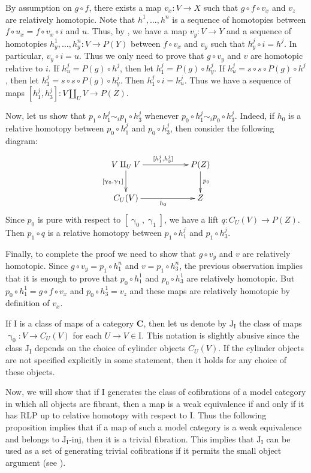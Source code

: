 \documentclass{tac}
\theoremstyle{definition}
\newcommand{\cat}[1]{\mathbf{#1}}
\newcommand{\C}{\cat{C}}
\newcommand{\I}{\mathrm{I}}
\newcommand{\J}{\mathrm{J}}
\newcommand{\class}[2]{#1\text{-}\mathrm{#2}}
\newcommand{\Iinj}[1][\I]{\class{#1}{inj}}
\newcommand{\Jinj}[1][]{\Iinj[\J#1]}
\newcommand{\cyli}{\upgamma}
\begin{document}
By assumption on $g \circ f$, there exists a map $v_x : V \to X$ such that $g \circ f \circ v_x$ and $v_z$ are relatively homotopic.
Note that $h^1, \ldots, h^n$ is a sequence of homotopies between $f \circ u_x = f \circ v_x \circ i$ and $u$.
Thus, by , we have a map $v_y : V \to Y$ and a sequence of homotopies $h^1_y, \ldots, h^n_y : V \to P(Y)$ between $f \circ v_x$ and $v_y$ such that $h^j_y \circ i = h^j$.
In particular, $v_y \circ i = u$.
Thus we only need to prove that $g \circ v_y$ and $v$ are homotopic relative to $i$.
If $h^j_u = P(g) \circ h^j$, then let $h^j_1 = P(g) \circ h^j_y$.
If $h^j_u = s \circ s \circ P(g) \circ h^j$, then let $h^j_1 = s \circ s \circ P(g) \circ h^j_y$.
Then $h^j_1 \circ i = h^j_u$.
Thus we have a sequence of maps $[h^j_1,h^j_3] : V \amalg_U V \to P(Z)$.

Now, let us show that $p_1 \circ h^j_1 \sim_i p_1 \circ h^j_3$ whenever $p_0 \circ h^j_1 \sim_i p_0 \circ h^j_3$.
Indeed, if $h_0$ is a relative homotopy between $p_0 \circ h^j_1$ and $p_0 \circ h^j_3$, then consider the following diagram:
\[ \xymatrix{ V \amalg_U V \ar[rr]^{[h^j_1, h^j_3]} \ar[d]_{[\cyli_0,\cyli_1]} & & P(Z) \ar[d]^{p_0} \\
              C_U(V) \ar[rr]_{h_0} & & Z
            } \]
Since $p_0$ is pure with respect to $[\cyli_0,\cyli_1]$, we have a lift $q : C_U(V) \to P(Z)$.
Then $p_1 \circ q$ is a relative homotopy between $p_1 \circ h^j_1$ and $p_1 \circ h^j_3$.

Finally, to complete the proof we need to show that $g \circ v_y$ and $v$ are relatively homotopic.
Since $g \circ v_y = p_1 \circ h^n_1$ and $v = p_1 \circ h^n_3$, the previous observation implies that it is enough to prove that $p_0 \circ h^1_1$ and $p_0 \circ h^1_3$ are relatively homotopic.
But $p_0 \circ h^1_1 = g \circ f \circ v_x$ and $p_0 \circ h^1_3 = v_z$ and these maps are relatively homotopic by definition of $v_x$.
\endproof

If $\I$ is a class of maps of a category $\C$, then let us denote by $\J_\I$ the class of maps $\cyli_0 : V \to C_U(V)$ for each $U \to V \in \I$.
This notation is slightly abusive since the class $\J_\I$ depends on the choice of cylinder objects $C_U(V)$.
If the cylinder objects are not specified explicitly in some statement, then it holds for any choice of these objects.

Now, we will show that if $\I$ generates the class of cofibrations of a model category in which all objects are fibrant,
then a map is a weak equivalence if and only if it has RLP up to relative homotopy with respect to $\I$.
Thus the following proposition implies that if a map of such a model category is a weak equivalence and belongs to $\Jinj[_\I]$, then it is a trivial fibration.
This implies that $\J_\I$ can be used as a set of generating trivial cofibrations if it permits the small object argument (see ).
\end{document}
